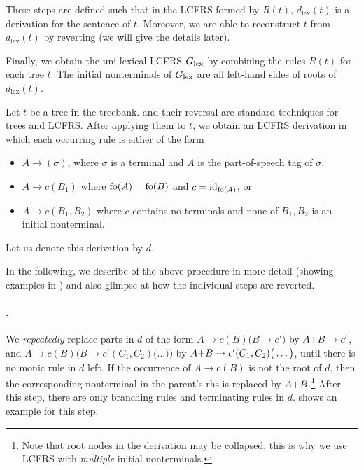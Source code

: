 \documentclass[../../document.tex]{subfiles}
\begin{document}
    These steps are defined such that in the LCFRS formed by $R(t)$, $d_{\mathrm{lex}}(t)$ is a derivation for the sentence of $t$.
    Moreover, we are able to reconstruct $t$ from $d_{\mathrm{lex}}(t)$ by reverting  (we will give the details later).

    Finally, we obtain the uni-lexical LCFRS $G_{\mathrm{lex}}$ by combining the rules $R(t)$ for each tree $t$.
    The initial nonterminals of $G_{\mathrm{lex}}$ are all left-hand sides of roots of $d_{\mathrm{lex}}(t)$.

    Let $t$ be a tree in the treebank.
     and their reversal are standard techniques for trees and LCFRS.
    After applying them to $t$, we obtain an LCFRS derivation in which each occurring rule is either of the form
    \begin{itemize}[nosep]
        \item \(A \to (\sigma)\), where $\sigma$ is a terminal and \(A\) is the part-of-speech tag of $\sigma$,
        \item \(A \to c(B_1)\) where \(\operatorname{fo}(A) = \operatorname{fo}(B)\) and \(c = \operatorname{id}_{\operatorname{fo}(A)}\), or
        \item \(A \to c (B_1, B_2)\) where \(c\) contains no terminals and none of \(B_1, B_2\) is an initial nonterminal.
    \end{itemize}
    Let us denote this derivation by $d$.

    In the following, we describe  of the above procedure in more detail (showing examples in ) and also glimpse at how the individual steps are reverted.


    \paragraph{.}
    We \emph{repeatedly} replace parts in \(d\) of the form
    \(A \to c (B) \big( B \to c' \big) \) by \( A\text+B \to c' \), and
    \(A \to c (B) \Big( B \to c'(C_1, C_2) \big( \ldots \big) \Big) \) by \( A\text+B \to c' (C_1, C_2) \big( \ldots \big) \),
    until there is no monic rule in \(d\) left.
    If the occurrence of \(A \to c (B)\) is not the root of \(d\), then the corresponding nonterminal in the parent's rhs is replaced by \(A\text+B\).\footnote{
        Note that root nodes in the derivation may be collapsed, this is why we use LCFRS with \emph{multiple} initial nonterminals.
    }
    After this step, there are only branching rules and terminating rules in \(d\).
     shows an example for this step.
\end{document}
